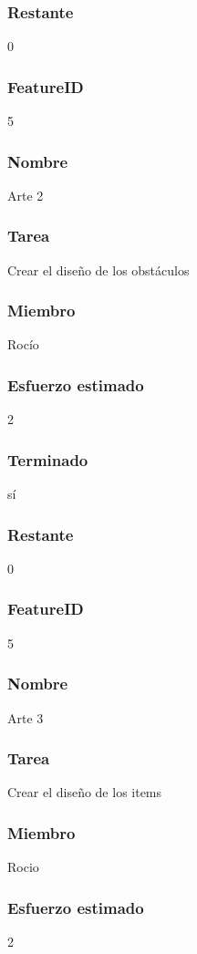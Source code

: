 \subsubsection{Restante} 0



\subsubsection{FeatureID} 5
\subsubsection{Nombre} Arte 2
\subsubsection{Tarea} Crear el diseño de los obstáculos
\subsubsection{Miembro} Rocío
\subsubsection{Esfuerzo estimado} 2
\subsubsection{Terminado} sí
\subsubsection{Restante} 0


\subsubsection{FeatureID} 5
\subsubsection{Nombre} Arte 3
\subsubsection{Tarea} Crear el diseño de los items
\subsubsection{Miembro} Rocio
\subsubsection{Esfuerzo estimado} 2
